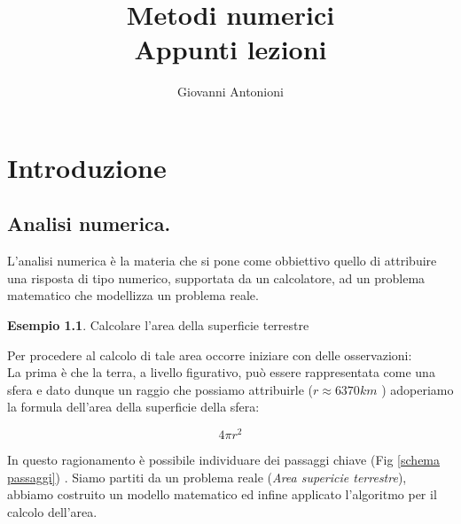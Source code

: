\documentclass[12pt, a4paper]{book}
\title{
	Metodi numerici \\
	\vspace{1cm}
	Appunti lezioni
}
\date{}
\author{Giovanni Antonioni}
\theoremstyle{definition}
\newtheorem{exmp}{Esempio}[section]
\begin{document}
\maketitle
\tableofcontents
\chapter{Introduzione}

\section{Analisi numerica.}

\begin{flushleft}

L'analisi numerica è la materia che si pone come obbiettivo quello di attribuire una risposta di tipo numerico, supportata da un calcolatore,  ad un problema matematico che modellizza un problema reale.

\begin{exmp}
Calcolare l'area della superficie terrestre
\end{exmp}

Per procedere al calcolo di tale area occorre iniziare con delle osservazioni:\\
La prima è che la terra, a livello figurativo, può essere rappresentata come una sfera e dato dunque un raggio che possiamo attribuirle ($r \approx 6370 km$ ) adoperiamo la formula dell'area della superficie della sfera:

\[ 
	4\pi r^2 
\]

In questo ragionamento è possibile individuare dei passaggi chiave (Fig \ref{schema passaggi}) .   Siamo partiti da un problema reale (\emph{Area supericie terrestre}), abbiamo costruito un modello matematico ed infine applicato l'algoritmo per il calcolo dell'area. 

\begin{figure}[h]
	\centering
\end{figure}
\end{flushleft}
\end{document}
